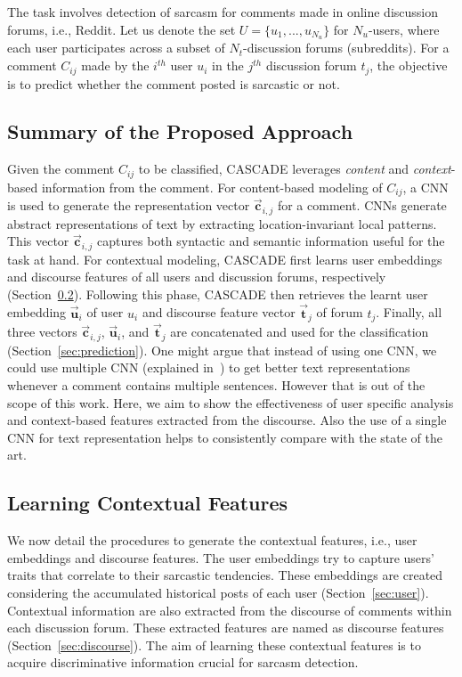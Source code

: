 \documentclass[11pt]{article}
\begin{document}
The task involves detection of sarcasm for comments made in online discussion forums, i.e., Reddit. Let us denote the set $U = \{u_1, ..., u_{N_u} \}$ for $N_u$-users, where each user participates across a subset of $N_t$-discussion forums (subreddits). For a comment $C_{ij}$ made by the $i^{th}$ user $u_i$ in the $j^{th}$ discussion forum $t_j$, the objective is to predict whether the comment posted is sarcastic or not. 

\subsection{Summary of the Proposed Approach} \label{sec:approach}

Given the comment $C_{ij}$ to be classified, CASCADE leverages \textit{content} and \textit{context}-based information from the comment. For content-based modeling of $C_{ij}$, a CNN is used to generate the representation vector $\vec{\bm{c}}_{i,j}$ for a comment. CNNs generate abstract representations of text by extracting location-invariant local patterns. This vector $\vec{\bm{c}}_{i,j}$ captures both syntactic and semantic information useful for the task at hand. For contextual modeling, CASCADE first learns user embeddings and discourse features of all users and discussion forums, respectively (Section~\ref{sec:context}).  Following this phase, CASCADE then retrieves the learnt user embedding $\vec{\bm{u}}_{i}$ of user $u_i$ and discourse feature vector $\vec{\bm{t}}_{j}$ of forum $t_j$. Finally, all three vectors $\vec{\bm{c}}_{i,j}$, $\vec{\bm{u}}_{i}$, and $\vec{\bm{t}}_{j}$ are concatenated and used for the classification (Section~\ref{sec:prediction}). One might argue that instead of using one CNN, we could use multiple CNN (explained in~\cite{majumder2017deep}) to get better text representations whenever a comment contains multiple sentences. However that is out of the scope of this work. Here, we aim to show the effectiveness of user specific analysis and context-based features extracted from the discourse. Also the use of a single CNN for text representation helps to consistently compare with the state of the art.


\subsection{Learning Contextual Features} \label{sec:context}

We now detail the procedures to generate the contextual features, i.e., user embeddings and discourse features. The user embeddings try to capture users' traits that correlate to their sarcastic tendencies. These embeddings are created considering the accumulated historical posts of each user (Section~\ref{sec:user}). Contextual information are also extracted from the discourse of comments within each discussion forum. These extracted features are named as discourse features (Section~\ref{sec:discourse}). The aim of learning these contextual features is to acquire discriminative information crucial for sarcasm detection.
\end{document}
